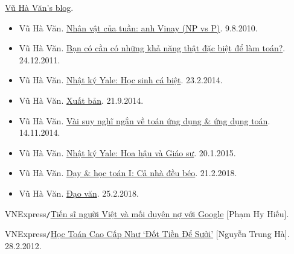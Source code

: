 \documentclass{article}
\numberwithin{equation}{section}
\begin{document}
\begin{thebibliography}{99}
	 \href{https://vuhavan.wordpress.com/}{Vũ Hà Văn's blog}.
	\begin{itemize}
		\item Vũ Hà Văn. \href{https://vuhavan.wordpress.com/2010/08/09/nhan-v%e1%ba%adt-c%e1%bb%a7a-tu%e1%ba%a7n-anh-vinay-np-vs-p/}{Nhân vật của tuần: anh Vinay (NP vs P)}. 9.8.2010.
		\item Vũ Hà Văn. \href{https://vuhavan.wordpress.com/2011/12/24/b%e1%ba%a1n-co-c%e1%ba%a7n-co-nh%e1%bb%afng-kh%e1%ba%a3-nang-th%e1%ba%adt-d%e1%ba%b7c-bi%e1%bb%87t-d%e1%bb%83-lam-toan/}{Bạn có cần có những khả năng thật đặc biệt để làm toán?}. 24.12.2011.
		\item Vũ Hà Văn. \href{https://vuhavan.wordpress.com/2014/02/23/nhat-ky-yale-hoc-sinh-ca-biet/}{Nhật ký Yale: Học sinh cá biệt}. 23.2.2014.
		\item Vũ Hà Văn. \href{https://vuhavan.wordpress.com/2014/09/21/xuat-ban/}{Xuất bản}. 21.9.2014.
		\item Vũ Hà Văn. \href{https://vuhavan.wordpress.com/2014/01/14/vai-suy-nghi-ngan-ve-toan-ung-dung-va-ung-dung-toan/}{Vài suy nghĩ ngắn về toán ứng dụng \& ứng dụng toán}. 14.11.2014.
		\item Vũ Hà Văn. \href{https://vuhavan.wordpress.com/2015/01/20/nhat-ky-yale-hoa-hau-va-giao-su/}{Nhật ký Yale: Hoa hậu và Giáo sư}. 20.1.2015.
		\item Vũ Hà Văn. \href{https://vuhavan.wordpress.com/2018/02/21/ca-nha-deu-beo/}{Dạy \& học toán I: Cả nhà đều béo}. 21.2.2018.
		\item Vũ Hà Văn. \href{https://vuhavan.wordpress.com/2018/02/25/dao-van/}{Đạo văn}. 25.2.2018.
	\end{itemize}
	
	 VNExpress\texttt{/}\href{https://vnexpress.net/tien-si-nguoi-viet-va-moi-duyen-no-voi-google-4430615.html}{Tiến sĩ người Việt và mối duyên nợ với Google} [Phạm Hy Hiếu].
	
	 VNExpress\texttt{/}\href{https://vnexpress.net/hoc-toan-cao-cap-nhu-dot-tien-de-suoi-2223794.html}{Học Toán Cao Cấp Như `Đốt Tiền Để Sưởi'} [Nguyễn Trung Hà]. 28.2.2012.
\end{thebibliography}
\end{document}
